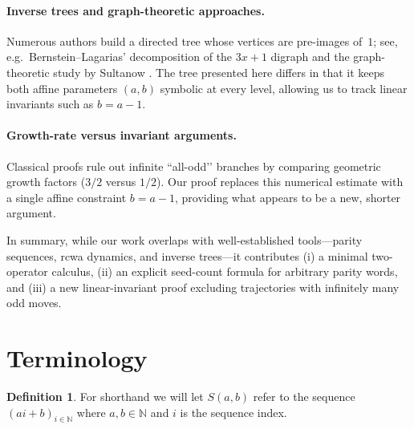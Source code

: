 \documentclass{article}
\theoremstyle{definition}
\newtheorem{definition}{Definition}[section]
\begin{document}
\paragraph{Inverse trees and graph-theoretic approaches.}
Numerous authors build a directed tree whose vertices are pre-images of~\(1\);
see, e.g.\ Bernstein–Lagarias’ decomposition of the \(3x+1\) digraph and the
graph-theoretic study by Sultanow \cite{Sultanow2020}.  The tree presented
here differs in that it keeps both affine parameters \((a,b)\) symbolic at
every level, allowing us to track linear invariants such as \(b=a-1\).

\paragraph{Growth-rate versus invariant arguments.}
Classical proofs rule out infinite “all-odd’’ branches by comparing
geometric growth factors (\(3/2\) versus \(1/2\)).  Our proof replaces this
numerical estimate with a single affine constraint \(b=a-1\), providing what
appears to be a new, shorter argument.

\medskip
\noindent
In summary, while our work overlaps with well-established tools—parity sequences,
rcwa dynamics, and inverse trees—it contributes (i) a minimal two-operator
calculus, (ii) an explicit seed-count formula for arbitrary parity words, and
(iii) a new linear-invariant proof excluding trajectories with infinitely many
odd moves.

\section{Terminology}

\begin{definition}
For shorthand we will let $S(a,b)$ refer to the sequence $ (ai+b)_{i\in\mathbb{N}}$ where $a,b\in \mathbb{N}$ and $i$ is the sequence index.
\end{definition}
\end{document}
